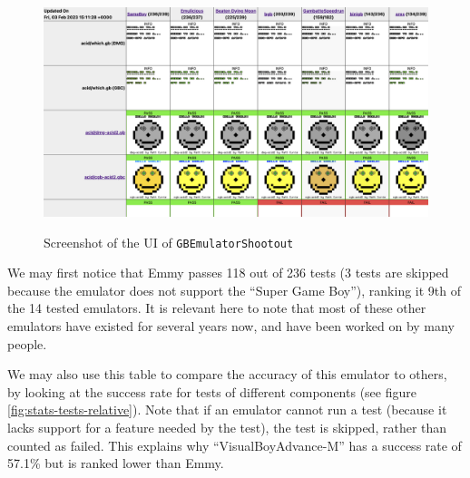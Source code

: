 \documentclass[11pt]{informatics-report}
\begin{document}
\begin{figure}[h]
    \centering
    \includegraphics[width=15cm]{images/gb-shootout}\\
    \caption{Screenshot of the UI of \texttt{GBEmulatorShootout}}
    \label{fig:gb-shootout}
\end{figure}

We may first notice that Emmy passes 118 out of 236 tests (3 tests are skipped because the emulator does not support the ``Super Game Boy''), ranking it 9th of the 14 tested emulators. It is relevant here to note that most of these other emulators have existed for several years now, and have been worked on by many people.

We may also use this table to compare the accuracy of this emulator to others, by looking at the success rate for tests of different components (see figure \ref{fig:stats-tests-relative}). Note that if an emulator cannot run a test (because it lacks support for a feature needed by the test), the test is skipped, rather than counted as failed. This explains why \mbox{``VisualBoyAdvance-M''} has a success rate of 57.1\% but is ranked lower than Emmy.
\end{document}
